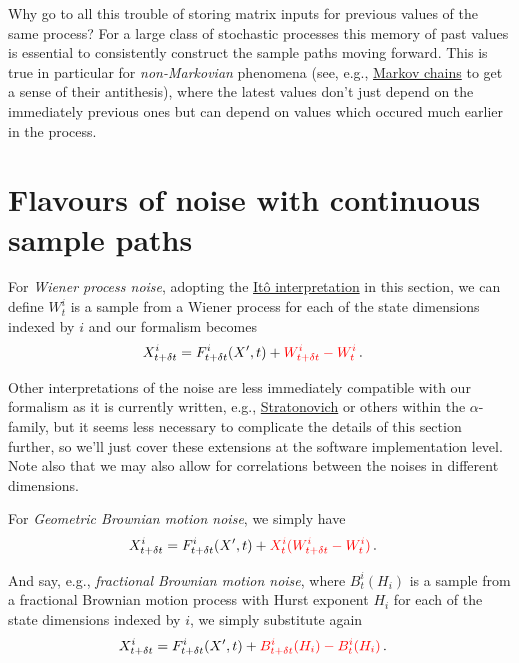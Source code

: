 \documentclass[sts]{imsart}
\begin{document}
Why go to all this trouble of storing matrix inputs for previous values of the same process? For a large class of stochastic processes this memory of past values is essential to consistently construct the sample paths moving forward. This is true in particular for \emph{non-Markovian} phenomena (see, e.g., \href{https://en.wikipedia.org/wiki/Markov_chain}{Markov chains} to get a sense of their antithesis), where the latest values don't just depend on the immediately previous ones but can depend on values which occured much earlier in the process.

\section*{Flavours of noise with continuous sample paths}

For \emph{Wiener process noise}, adopting the \href{https://en.wikipedia.org/wiki/It\%C3\%B4_calculus}{Itô interpretation} in this section, we can define $W^i_{t}$ is a sample from a Wiener process for each of the state dimensions indexed by $i$ and our formalism becomes
\begin{align}
& X^i_{t+\delta t} = F^i_{t+\delta t}(X', t) + \textcolor{red}{W^i_{t+\delta t}-W^i_{t}}\,.
\end{align}

Other interpretations of the noise are less immediately compatible with our formalism as it is currently written, e.g., \href{https://en.wikipedia.org/wiki/Stratonovich_integral}{Stratonovich} or others within the $\alpha$-family, but it seems less necessary to complicate the details of this section further, so we'll just cover these extensions at the software implementation level. Note also that we may also allow for correlations between the noises in different dimensions. 

For \emph{Geometric Brownian motion noise}, we simply have
\begin{align}
& X^i_{t+\delta t} = F^i_{t+\delta t}(X', t) + \textcolor{red}{X^i_{t}(W^i_{t+\delta t}-W^i_{t})}\,.
\end{align}

And say, e.g., \emph{fractional Brownian motion noise}, where $B^i_{t}({H_i})$ is a sample from a fractional Brownian motion process with Hurst exponent $H_i$ for each of the state dimensions indexed by $i$, we simply substitute again
\begin{align}
& X^i_{t+\delta t} = F^i_{t+\delta t}(X', t) + \textcolor{red}{B^i_{t+\delta t}({H_i})-B^i_{t}({H_i})}\,.
\end{align}
\end{document}
